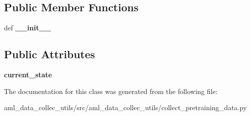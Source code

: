 \subsection*{Public Member Functions}
\begin{DoxyCompactItemize}
\item 
\hypertarget{classaml__data__collec__utils_1_1collect__pretraining__data_1_1_agent_proxy_a0ba09dbbb1e176464aa07485f77cf9f9}{def {\bfseries \-\_\-\-\_\-init\-\_\-\-\_\-}}\label{classaml__data__collec__utils_1_1collect__pretraining__data_1_1_agent_proxy_a0ba09dbbb1e176464aa07485f77cf9f9}

\end{DoxyCompactItemize}
\subsection*{Public Attributes}
\begin{DoxyCompactItemize}
\item 
\hypertarget{classaml__data__collec__utils_1_1collect__pretraining__data_1_1_agent_proxy_aeb2225b6b78553e00dfa022cd7bafd49}{{\bfseries current\-\_\-state}}\label{classaml__data__collec__utils_1_1collect__pretraining__data_1_1_agent_proxy_aeb2225b6b78553e00dfa022cd7bafd49}

\end{DoxyCompactItemize}


The documentation for this class was generated from the following file\-:\begin{DoxyCompactItemize}
\item 
aml\-\_\-data\-\_\-collec\-\_\-utils/src/aml\-\_\-data\-\_\-collec\-\_\-utils/collect\-\_\-pretraining\-\_\-data.\-py\end{DoxyCompactItemize}
